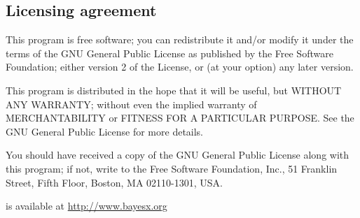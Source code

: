 { \subsection*{Licensing agreement}

This program is free software; you can redistribute it and/or modify it under the terms of the GNU General Public License
as published by the Free Software Foundation; either version 2 of the License, or (at your option) any later version.

This program is distributed in the hope that it will be useful, but WITHOUT ANY WARRANTY; without even the implied warranty of MERCHANTABILITY or FITNESS FOR A PARTICULAR PURPOSE. See the GNU General Public License for more details.

You should have received a copy of the GNU General Public License along with this program; if not, write to the Free Software Foundation, Inc., 51 Franklin Street, Fifth Floor, Boston, MA  02110-1301, USA.

\vspace{0.5cm}

\BayesX is available at { \href{http://www.bayesx.org}{http://www.bayesx.org}}}
